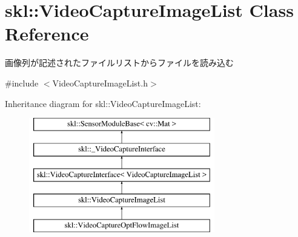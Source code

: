 \hypertarget{classskl_1_1_video_capture_image_list}{}\section{skl\+:\+:Video\+Capture\+Image\+List Class Reference}
\label{classskl_1_1_video_capture_image_list}


画像列が記述されたファイルリストからファイルを読み込む  




{\ttfamily \#include $<$Video\+Capture\+Image\+List.\+h$>$}

Inheritance diagram for skl\+:\+:Video\+Capture\+Image\+List\+:\begin{figure}[H]
\begin{center}
\leavevmode
\includegraphics[height=5.000000cm]{classskl_1_1_video_capture_image_list}
\end{center}
\end{figure}
